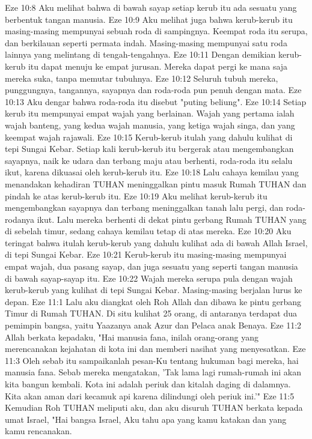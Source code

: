 Eze 10:8  Aku melihat bahwa di bawah sayap setiap kerub itu ada sesuatu yang berbentuk tangan manusia.
Eze 10:9  Aku melihat juga bahwa kerub-kerub itu masing-masing mempunyai sebuah roda di sampingnya. Keempat roda itu serupa, dan berkilauan seperti permata indah. Masing-masing mempunyai satu roda lainnya yang melintang di tengah-tengahnya.
Eze 10:11  Dengan demikian kerub-kerub itu dapat menuju ke empat jurusan. Mereka dapat pergi ke mana saja mereka suka, tanpa memutar tubuhnya.
Eze 10:12  Seluruh tubuh mereka, punggungnya, tangannya, sayapnya dan roda-roda pun penuh dengan mata.
Eze 10:13  Aku dengar bahwa roda-roda itu disebut "puting beliung".
Eze 10:14  Setiap kerub itu mempunyai empat wajah yang berlainan. Wajah yang pertama ialah wajah banteng, yang kedua wajah manusia, yang ketiga wajah singa, dan yang keempat wajah rajawali.
Eze 10:15  Kerub-kerub itulah yang dahulu kulihat di tepi Sungai Kebar. Setiap kali kerub-kerub itu bergerak atau mengembangkan sayapnya, naik ke udara dan terbang maju atau berhenti, roda-roda itu selalu ikut, karena dikuasai oleh kerub-kerub itu.
Eze 10:18  Lalu cahaya kemilau yang menandakan kehadiran TUHAN meninggalkan pintu masuk Rumah TUHAN dan pindah ke atas kerub-kerub itu.
Eze 10:19  Aku melihat kerub-kerub itu mengembangkan sayapnya dan terbang meninggalkan tanah lalu pergi, dan roda-rodanya ikut. Lalu mereka berhenti di dekat pintu gerbang Rumah TUHAN yang di sebelah timur, sedang cahaya kemilau tetap di atas mereka.
Eze 10:20  Aku teringat bahwa itulah kerub-kerub yang dahulu kulihat ada di bawah Allah Israel, di tepi Sungai Kebar.
Eze 10:21  Kerub-kerub itu masing-masing mempunyai empat wajah, dua pasang sayap, dan juga sesuatu yang seperti tangan manusia di bawah sayap-sayap itu.
Eze 10:22  Wajah mereka serupa pula dengan wajah kerub-kerub yang kulihat di tepi Sungai Kebar. Masing-masing berjalan lurus ke depan.
Eze 11:1  Lalu aku diangkat oleh Roh Allah dan dibawa ke pintu gerbang Timur di Rumah TUHAN. Di situ kulihat 25 orang, di antaranya terdapat dua pemimpin bangsa, yaitu Yaazanya anak Azur dan Pelaca anak Benaya.
Eze 11:2  Allah berkata kepadaku, "Hai manusia fana, inilah orang-orang yang merencanakan kejahatan di kota ini dan memberi nasihat yang menyesatkan.
Eze 11:3  Oleh sebab itu sampaikanlah pesan-Ku tentang hukuman bagi mereka, hai manusia fana. Sebab mereka mengatakan, 'Tak lama lagi rumah-rumah ini akan kita bangun kembali. Kota ini adalah periuk dan kitalah daging di dalamnya. Kita akan aman dari kecamuk api karena dilindungi oleh periuk ini.'"
Eze 11:5  Kemudian Roh TUHAN meliputi aku, dan aku disuruh TUHAN berkata kepada umat Israel, "Hai bangsa Israel, Aku tahu apa yang kamu katakan dan yang kamu rencanakan.
